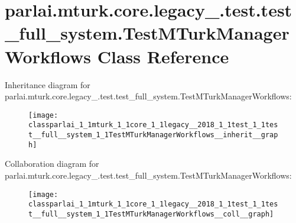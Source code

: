 \hypertarget{classparlai_1_1mturk_1_1core_1_1legacy__2018_1_1test_1_1test__full__system_1_1TestMTurkManagerWorkflows}{}\section{parlai.\+mturk.\+core.\+legacy\+\_.\+test.\+test\+\_\+full\+\_\+system.\+Test\+M\+Turk\+Manager\+Workflows Class Reference}
\label{classparlai_1_1mturk_1_1core_1_1legacy__2018_1_1test_1_1test__full__system_1_1TestMTurkManagerWorkflows}


Inheritance diagram for parlai.\+mturk.\+core.\+legacy\+\_.\+test.\+test\+\_\+full\+\_\+system.\+Test\+M\+Turk\+Manager\+Workflows\+:
\nopagebreak
\begin{figure}[H]
\begin{center}
\leavevmode
\texttt{[image: classparlai\_1\_1mturk\_1\_1core\_1\_1legacy\_\_2018\_1\_1test\_1\_1test\_\_full\_\_system\_1\_1TestMTurkManagerWorkflows\_\_inherit\_\_graph]}
\end{center}
\end{figure}


Collaboration diagram for parlai.\+mturk.\+core.\+legacy\+\_.\+test.\+test\+\_\+full\+\_\+system.\+Test\+M\+Turk\+Manager\+Workflows\+:
\nopagebreak
\begin{figure}[H]
\begin{center}
\leavevmode
\texttt{[image: classparlai\_1\_1mturk\_1\_1core\_1\_1legacy\_\_2018\_1\_1test\_1\_1test\_\_full\_\_system\_1\_1TestMTurkManagerWorkflows\_\_coll\_\_graph]}
\end{center}
\end{figure}
